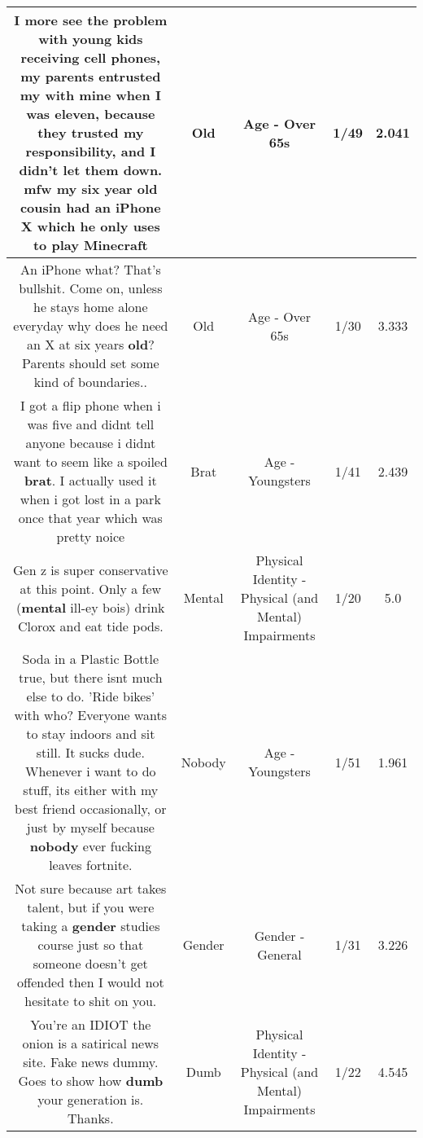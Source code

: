 \documentclass[11pt]{article}
\newlength\mylength
\begin{document}
\begin{center}
\begin{longtable}{|C{.65\mylength}|C{.30\mylength}|C{.12\mylength}|C{.12\mylength}|C{.12\mylength}|}
  \small I more see the problem with young kids receiving cell phones, my parents entrusted my with mine when I was eleven, because they trusted my responsibility, and I didn't let them down. mfw my six year \textbf{old} cousin had an iPhone X which he only uses to play Minecraft\normalsize   & Old & Age - Over 65s & 1/49 & 2.041 \\  \hline
  \small An iPhone what? That's bullshit. Come on, unless he stays home alone everyday why does he need an X at six years \textbf{old}? Parents should set some kind of boundaries..\normalsize   & Old & Age - Over 65s & 1/30 & 3.333 \\  \hline
  \small I got a flip phone when i was five and didnt tell anyone because i didnt want to seem like a spoiled \textbf{brat}. I actually used it when i got lost in a park once that year which was pretty noice\normalsize   & Brat & Age - Youngsters & 1/41 & 2.439 \\  \hline
  \small Gen z is super conservative at this point. Only a few (\textbf{mental} ill-ey bois) drink Clorox and eat tide pods.\normalsize   & Mental & Physical Identity - Physical (and Mental) Impairments & 1/20 & 5.0 \\  \hline
  \small Soda in a Plastic Bottle true, but there isnt much else to do. 'Ride bikes' with who? Everyone wants to stay indoors and sit still. It sucks dude. Whenever i want to do stuff, its either with my best friend occasionally, or just by myself because \textbf{nobody} ever fucking leaves fortnite.\normalsize   & Nobody & Age - Youngsters & 1/51 & 1.961 \\  \hline
  \small Not sure because art takes talent, but if you were taking a \textbf{gender} studies course just so that someone doesn't get offended then I would not hesitate to shit on you.\normalsize   & Gender & Gender - General & 1/31 & 3.226 \\  \hline
  \small You're an IDIOT the onion is a satirical news site. Fake news dummy. Goes to show how \textbf{dumb} your generation is. Thanks.\normalsize   & Dumb & Physical Identity - Physical (and Mental) Impairments & 1/22 & 4.545 \\  \hline

\end{longtable}
\end{center}
\end{document}

